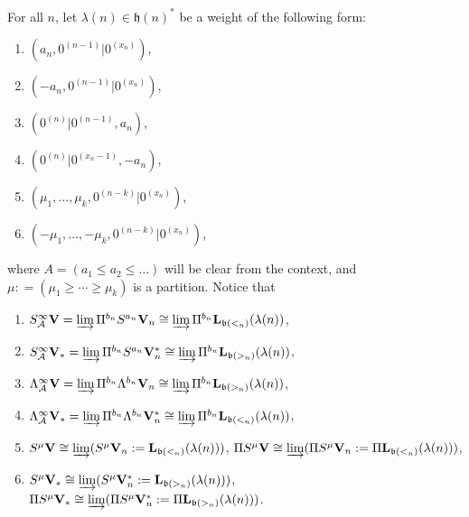 \documentclass[12pt]{amsart}
\newcommand\fh{\mathfrak{h}}
\newcommand\fb{\mathfrak{b}}
\newcommand\cA{\mathcal{A}}
\newcommand\bV{\mathbf{V}}
\newcommand\bL{\mathbf{L}}
\theoremstyle{plain}
\theoremstyle{definition}
\numberwithin{equation}{section}
\begin{document}
For all $n$, let $\lambda(n)\in \fh(n)^*$ be a weight of the following form:
\begin{enumerate}
\item[($\Omega_1$)] \label{sym.type.mod} $(a_n,0^{(n-1)}|0^{(x_n)})$,
\item [($\Omega_2$)] \label{sym.type.mod.dual} $(-a_n, 0^{(n-1)}|0^{(x_n)})$,
\item [($\Omega_3$)] \label{ext.type.mod} $(0^{(n)}|0^{(n-1)}, a_n)$,
\item [($\Omega_4$)] \label{ext.type.mod.dual} $(0^{(n)}|0^{(x_n-1)}, -a_n)$,
\item [($\Omega_5$)] \label{partition.type.mod} $(\mu_1,\ldots,\mu_k,0^{(n-k)}|0^{(x_n)})$,
\item [($\Omega_6$)] \label{partition.type.mod.dual} $(-\mu_1,\ldots,-\mu_k,0^{(n-k)}|0^{(x_n)})$,
\end{enumerate}
where $A=(a_1\leq a_2\leq \ldots)$ will be clear from the context, and $\mu : = (\mu_1\geq \cdots \geq \mu_k)$ is a partition.  Notice that
\begin{enumerate}
\item [($\Omega_1'$)] \label{sym.type.mod} $S_\cA^{\infty}\bV  = \varinjlim  \Pi^{b_n} S^{a_n}\bV_{n} \cong \varinjlim \Pi^{b_n} \bL_{\fb(<_n)}(\lambda(n))$,
\item [($\Omega_2'$)] \label{sym.type.mod.dual} $S_\cA^{\infty}\bV_*  =   \varinjlim  \Pi^{b_n} S^{a_n}\bV_{n}^* \cong \varinjlim \Pi^{b_n} \bL_{\fb(>_n)}(\lambda(n))$,
\item [($\Omega_3'$)] \label{ext.type.mod} $\Lambda_\cA^{\infty}\bV =  \varinjlim  \Pi^{b_n} \Lambda^{b_n}\bV_{n} \cong \varinjlim \Pi^{b_n}\bL_{\fb(>_n)}(\lambda(n))$,
\item [($\Omega_4'$)] \label{ext.type.mod.dual} $\Lambda_\cA^{\infty}\bV_* = \varinjlim  \Pi^{b_n} \Lambda^{b_n}\bV_{n}^* \cong \varinjlim \Pi^{b_n} \bL_{\fb(<_n)}(\lambda(n))$,
\item [($\Omega_5'$)] \label{partition.type.mod} $S^\mu \bV\cong \varinjlim (S^\mu \bV_n:= \bL_{\fb(<_n)}(\lambda(n)))$, $\Pi S^\mu \bV\cong \varinjlim (\Pi S^\mu \bV_n:= \Pi\bL_{\fb(<_n)}(\lambda(n)))$,
\item [($\Omega_6'$)] \label{partition.type.mod.dual} $S^\mu \bV_* \cong \varinjlim ( S^\mu \bV_n^* := \bL_{\fb(>_n)}(\lambda(n)))$, $\Pi S^\mu \bV_* \cong \varinjlim (\Pi S^\mu \bV_n^* := \Pi \bL_{\fb(>_n)}(\lambda(n)))$.
\end{enumerate}
\end{document}
